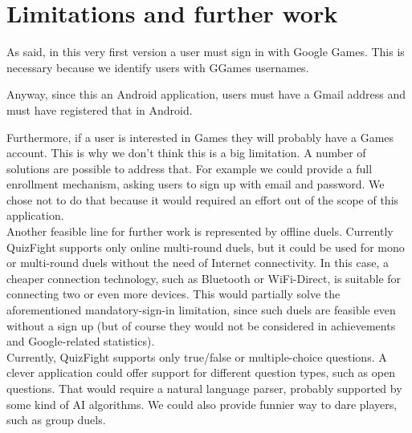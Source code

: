 \section{Limitations and further work}\label{sec:limitations}

As said, in this very first version a user must sign in with Google Games.
This is necessary because we identify users with GGames usernames.

Anyway, since this an Android application, users must have a Gmail address and
must have registered that in Android.

Furthermore, if a user is interested in Games they will probably have a Games
account.
This is why we don't think this is a big limitation.
A number of solutions are possible to address that.
For example we could provide a full enrollment mechanism, asking users to sign
up with email and password. We chose not to do that because it would required
an effort out of the scope of this application.  \\

Another feasible line for further work is represented by offline duels.
Currently QuizFight supports only online multi-round duels, but it could be
used for mono or multi-round duels without the need of Internet connectivity.
In this case, a cheaper connection technology, such as Bluetooth or
WiFi-Direct, is suitable for connecting two or even more devices.
This would partially solve the aforementioned mandatory-sign-in limitation,
since such duels are feasible even without a sign up (but of course they would
not be considered in achievements and Google-related statistics). \\

Currently, QuizFight supports only true/false or multiple-choice questions.
A clever application could offer support for different question types, such as
open questions.
That would require a natural language parser, probably supported by some kind of AI
algorithms.
We could also provide funnier way to dare players, such as group duels.